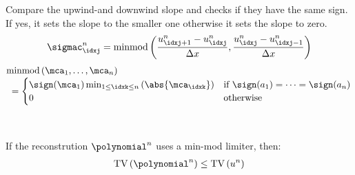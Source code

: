 \begin{defnbox}\nospacing
    \begin{defn}\label{defn:minmod_limiter}
        Compare the upwind-and downwind slope and checks if they have the same sign.
        If yes, it sets the slope to the smaller one otherwise it sets the slope to zero.
        \begin{align}
          \sigmac_{\idxj}^{n}=\text{minmod} \left(\frac{u_{\idxj+1}^{n}-u_{\idxj}^{n}}{\Delta x},\frac{u_{\idxj}^{n}-u_{\idxj-1}^{n}}{\Delta x}\right)
        \end{align}
        \begin{align}
          &\text{minmod}\left(\mca_{1},\ldots,\mca_{n}\right)\\[-1\jot]
          &\hspace{1mm}=\begin{cases}
              \sign(\mca_{1})\min_{1\leq\idxk\leq n}\left(\abs{\mca_{\idxk}}\right)&\text{if }\sign(a_{1})=\cdots=\sign(a_{n}) \\
              0&\text{otherwise}
          \end{cases}\nonumber
        \end{align}
    \end{defn}
\end{defnbox}
\begin{corbox}\nospacing
    \begin{cor}\label{cor:minmod_is_tvd}\leavevmode\\
        \begin{minipage}{0.47\textwidth}
        If the reconstrution $\polynomial^{n}$ uses a min-mod limiter, then:
        \begin{align}
          \text{TV} \left(\polynomial^{n}\right)\leq \text{TV}\left(u^{n}\right)
        \end{align}
        \end{minipage}
        \begin{minipage}[c]{0.5\textwidth}
            \begin{figure}[H]
                \centering{
                  \def\svgwidth{160pt}
                  \resizebox{\linewidth}{!}{}
                }
            \end{figure}
        \end{minipage}
    \end{cor}
\end{corbox}

